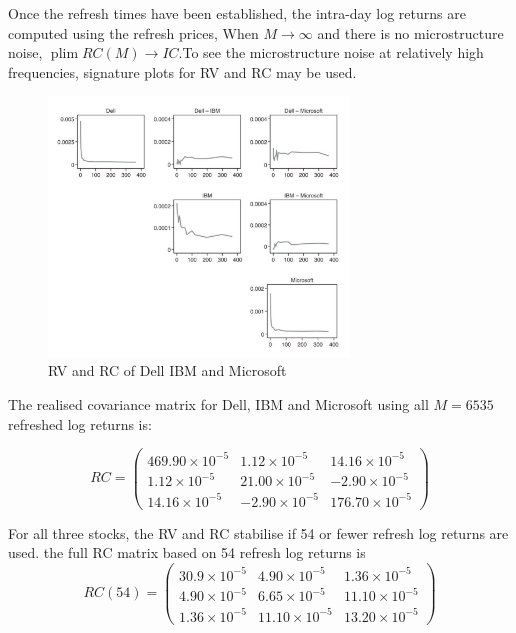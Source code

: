 \documentclass[11pt]{article}
\begin{document}
Once the refresh times have been established, the intra-day log returns are computed using the refresh prices, When $M\rightarrow\infty$ and there is no microstructure noise, $\operatorname{plim} RC(M) \rightarrow IC$.To see the microstructure noise at relatively high frequencies, signature plots for RV and RC may be used.

\begin{figure}[h]
    \centering
    \includegraphics[width=8cm]{pics/refresh signature plots.png}
    \caption{RV and RC of Dell IBM and Microsoft}
    \label{fig:refresh rate covariance signature plots}
\end{figure}

The realised covariance matrix for Dell, IBM and Microsoft using all $M=6535$ refreshed log returns is:

\begin{equation}
R C=\left(\begin{array}{rrr}
469.90 \times 10^{-5} & 1.12 \times 10^{-5} & 14.16 \times 10^{-5} \\
1.12 \times 10^{-5} & 21.00 \times 10^{-5} & -2.90 \times 10^{-5} \\
14.16 \times 10^{-5} & -2.90 \times 10^{-5} & 176.70 \times 10^{-5}
\end{array}\right)
\end{equation}

For all three stocks, the RV and RC stabilise if 54 or fewer refresh log returns are used. the full RC matrix based on 54 refresh log returns is
\begin{equation}
R C(54)=\left(\begin{array}{rrr}
30.9 \times 10^{-5} & 4.90 \times 10^{-5} & 1.36 \times 10^{-5} \\
4.90 \times 10^{-5} & 6.65 \times 10^{-5} & 11.10 \times 10^{-5} \\
1.36 \times 10^{-5} & 11.10 \times 10^{-5} & 13.20 \times 10^{-5}
\end{array}\right)
\end{equation}
\end{document}
